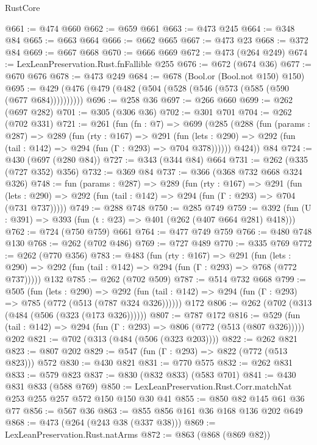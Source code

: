 \begin{lexlean}{RustCore}
\begin{coremodule}
@661 := @474 @660
@662 := @659 @661
@663 := @473 @245
@664 := @348 @84
@665 := @663 @664
@666 := @662 @665
@667 := @473 @23
@668 := @372 @84
@669 := @667 @668
@670 := @666 @669
@672 := @473 (@264 @249)
@674 := LexLeanPreservation.Rust.fnFallible @255
@676 := @672 (@674 @36)
@677 := @670 @676
@678 := @473 @249
@684 := @678 (Bool.or (Bool.not @150) @150)
@695 := @429 (@476 (@479 (@482 (@504 (@528 (@546 (@573 (@585 (@590 (@677 @684))))))))))
@696 := @258 @36
@697 := @266 @660
@699 := @262 (@697 @282)
@701 := @305 (@306 @36)
@702 := @301 @701
@704 := @262 (@702 @331)
@721 := @261
    (fun (fn : @7) =>
    @699
      (@285
        (@288
          (fun (params : @287) =>
          @289
            (fun (rty : @167) =>
            @291
              (fun (lets : @290) =>
              @292 (fun (tail : @142) => @294 (fun (Γ : @293) => @704 @378))))))
        @424))
    @84
@724 := @430 (@697 (@280 @84))
@727 := @343 (@344 @84) @664
@731 := @262 (@335 (@727 @352) @356)
@732 := @369 @84
@737 := @366 (@368 @732 @668 @324 @326)
@748 := fun (params : @287) =>
  @289
    (fun (rty : @167) =>
    @291
      (fun (lets : @290) => @292 (fun (tail : @142) => @294 (fun (Γ : @293) => @704 (@731 @737)))))
@749 := @288 @748
@750 := @285 @749
@759 := @392 (fun (U : @391) => @393 (fun (t : @23) => @401 (@262 (@407 @664 @281) @418)))
@762 := @724 (@750 @759) @661
@764 := @477 @749 @759
@766 := @480 @748 @130
@768 := @262 (@702 @486)
@769 := @727 @489
@770 := @335 @769
@772 := @262 (@770 @356)
@783 := @483
    (fun (rty : @167) =>
    @291
      (fun (lets : @290) => @292 (fun (tail : @142) => @294 (fun (Γ : @293) => @768 (@772 @737)))))
    @132
@785 := @262 (@702 @509)
@787 := @514 @732 @668
@799 := @505
    (fun (lets : @290) =>
    @292 (fun (tail : @142) => @294 (fun (Γ : @293) => @785 (@772 (@513 (@787 @324 @326))))))
    @172
@806 := @262 (@702 (@313 (@484 (@506 (@323 (@173 @326))))))
@807 := @787 @172
@816 := @529 (fun (tail : @142) => @294 (fun (Γ : @293) => @806 (@772 (@513 (@807 @326))))) @202
@821 := @702 (@313 (@484 (@506 (@323 @203))))
@822 := @262 @821
@823 := @807 @202
@829 := @547 (fun (Γ : @293) => @822 (@772 (@513 @823))) @572
@830 := @430 @821
@831 := @770 @575
@832 := @262 @831
@833 := @579 @823
@837 := @830 (@832 @833) (@583 @701)
@841 := @430 @831 @833 (@588 @769)
@850 := LexLeanPreservation.Rust.Corr.matchNat @253 @255 @257 @572 @150 @150 @30 @41
@855 := @850 @82 @145 @61 @36 @77
@856 := @567 @36
@863 := @855 @856 @161 @36 @168 @136 @202 @649
@868 := @473 (@264 (@243 @38 (@337 @38)))
@869 := LexLeanPreservation.Rust.natArms
@872 := @863 (@868 (@869 @82))

\end{coremodule}
\end{lexlean}
